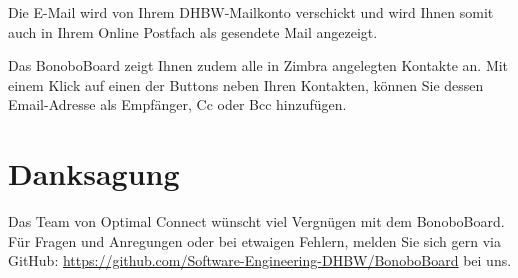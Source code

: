 \documentclass[a4paper,11pt]{scrartcl}
\begin{document}
\noindent Die E-Mail wird von Ihrem DHBW-Mailkonto verschickt und wird Ihnen somit auch in Ihrem Online Postfach als gesendete Mail angezeigt.

Das BonoboBoard zeigt Ihnen zudem alle in Zimbra angelegten Kontakte an. Mit einem Klick auf einen der Buttons neben Ihren Kontakten, können Sie dessen Email-Adresse als Empfänger, Cc oder Bcc hinzufügen.

\section{Danksagung}
Das Team von Optimal Connect wünscht viel Vergnügen mit dem BonoboBoard. Für Fragen und Anregungen oder bei etwaigen Fehlern, melden Sie sich gern via GitHub: \url{https://github.com/Software-Engineering-DHBW/BonoboBoard} bei uns.
\end{document}
